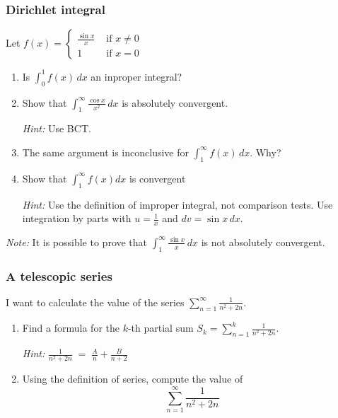 \begin{frame}[t]
	\fontsize{12}{12}\selectfont
	\frametitle{Dirichlet integral}

	Let $\displaystyle f(x) =
	\begin{cases}
		\frac{\sin x}{x} & \text{ if } x \neq 0 \\
		1                & \text{ if } x = 0
	\end{cases}$
	\vspace{.1cm}

	\begin{enumerate}
		\item Is \; $\displaystyle \int_{0}^{1}\! f(x) \, dx$ \; an inproper integral?

		\item Show that \; $\displaystyle \int_{1}^{\infty}\frac{\cos x}{x^{2}}\, dx$
			\;is absolutely convergent.
			\vspace{.1cm}

			\emph{Hint:} Use BCT.

		\item The same argument is inconclusive for $\displaystyle \int_{1}^{\infty}\!
			\! f(x) \, dx$. Why?

		\item Show that \; $\displaystyle \int_{1}^{\infty}\! \! f(x) dx$ \; is convergent
			\vspace{.1cm}

			\emph{Hint:} Use the definition of improper integral, not comparison tests.
			Use integration by parts with $u=\frac{1}{x}$ and $dv= \sin x \,dx$.
			\vspace{.1cm}
	\end{enumerate}

	{\fontsize{10}{10}\selectfont \emph{Note:} It is possible to prove that \; $\displaystyle \int_{1}^{\infty}\! \! \frac{\sin x}{x}\, dx$ is not absolutely convergent. }
\end{frame}

\begin{frame}[t]
	\fontsize{13}{13}\selectfont
	\frametitle{A telescopic series}
	I want to calculate the value of the series \;
	$\displaystyle \sum_{n=1}^{\infty}\frac{1}{n^{2}+2n}.$
	\vspace{.5cm}
	\begin{enumerate}
		\item Find a formula for the $k$-th partial sum $\displaystyle S_{k}= \sum_{n=1}
			^{k}\frac{1}{n^{2}+2n}.$

			\emph{Hint:} \; $\displaystyle \frac{1}{n^{2}+2n}\; = \; \frac{A}{n}+ \frac{B}{n+2}$
			\vspace{.5cm}

		\item Using the definition of series, compute the value of
			\[
				\sum_{n=1}^{\infty}\frac{1}{n^{2}+2n}
			\]
	\end{enumerate}
\end{frame}


